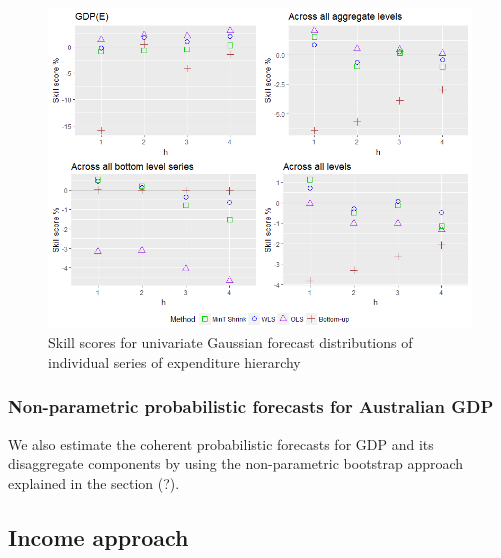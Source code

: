 \documentclass[graybox]{svmult}
\begin{document}
\begin{figure}[H]
	\centering
	\small
	\includegraphics[scale=0.50]{Figs/Results/EXP-ProbGaussF-UnivS_CRPS.png}
	\caption{Skill scores for univariate Gaussian forecast distributions of individual series of expenditure hierarchy}\label{Exp_ProbGaus_UnivS}
\end{figure}










\subsubsection{Non-parametric probabilistic forecasts for Australian GDP}

We also estimate the coherent probabilistic forecasts for GDP and its disaggregate components by using the non-parametric bootstrap approach explained in the section (?).

\subsection*{Income approach}
\end{document}
